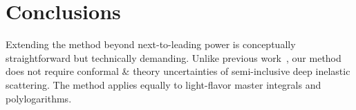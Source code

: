 \section{Conclusions}\label{sec:conclusions}

Extending the method beyond next-to-leading power is conceptually
straightforward but technically demanding. Unlike previous
work~\cite{TPC:2192-Learning-Scale-Variations-from-the-Dark-Machines-Dataset-October-4-2026},
our method does not require conformal & theory uncertainties of
semi-inclusive deep inelastic scattering. The method applies equally to
light-flavor master integrals and polylogarithms.

